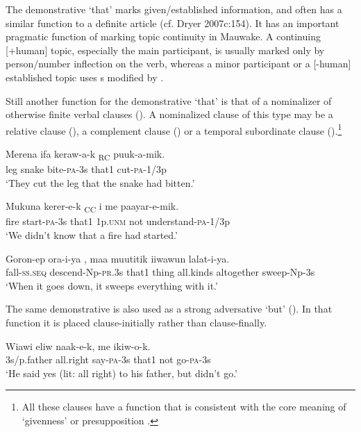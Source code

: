 The demonstrative  `that' marks given/established information, and often has a similar function to a definite article (cf. Dryer 2007c:154). It has an important pragmatic function of marking topic continuity in Mauwake. A continuing [+human] topic, especially the main participant, is usually marked only by person/number inflection on the verb, whereas a minor participant or a [-human] established topic uses s modified by .

Still another function for the demonstrative  `that' is that of a nominalizer of otherwise finite verbal clauses (). A nominalized clause of this type may be a relative clause  (), a complement clause  () or a temporal subordinate clause  ().\footnote{All these clauses have a function that is consistent with the core meaning of `givenness' \citep{Haiman1978} or presupposition \citep{Reesink1987}.}

\ea%
\label{ex:3:x687}
\gll {\ob}Merena ifa keraw-a-k \textsubscript{RC} puuk-a-mik. \\
leg snake bite-\textsc{pa}-3s that1 cut-\textsc{pa}-1/3p\\
\glt`They cut the leg that the snake had bitten.'
\z

\ea%
\label{ex:3:x689}
\gll {\ob}Mukuna kerer-e-k \textsubscript{CC} i me paayar-e-mik. \\
fire start-\textsc{pa}-3s that1 1p.\textsc{unm} not understand-\textsc{pa}-1/3p\\
\glt`We didn't know that a fire had started.'
\z

\ea%
\label{ex:3:x688}
\gll {\ob}Goron-ep ora-i-ya ,{\cb} maa muutitik iiwawun lalat-i-ya.\\
fall-\textsc{ss}.\textsc{seq} descend-Np-\textsc{pr}.3s that1 thing all.kinds altogether sweep-Np-3s\\
\glt`When it goes down, it sweeps everything with it.'
\z

The same demonstrative is also used as a strong adversative `but'  (). In that function it is placed clause-initially rather than clause-finally.

\ea%
\label{ex:3:x690}
\gll Wiawi eliw naak-e-k,  me ikiw-o-k. \\
3s/p.father all.right say-\textsc{pa}-3s that1 not go-\textsc{pa}-3s\\
\glt`He said yes (lit: all right) to his father, but didn't go.'
\z

